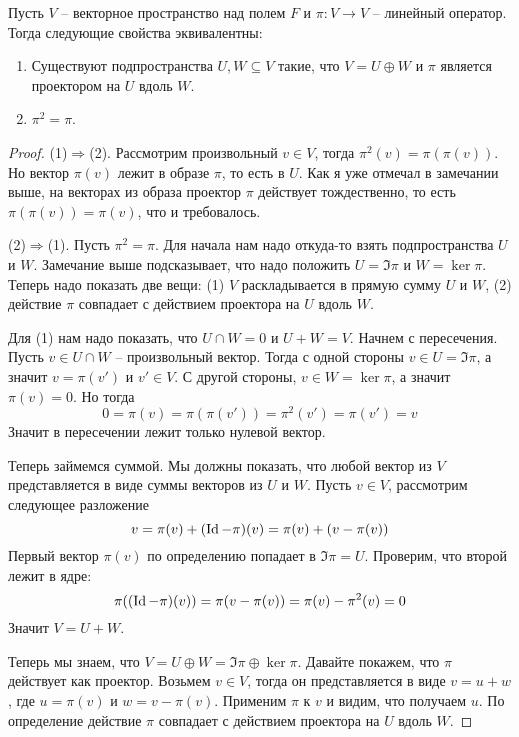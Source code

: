 \begin{claim}
Пусть $V$ -- векторное пространство над полем $F$ и $\pi\colon V\to V$ -- линейный оператор.
Тогда следующие свойства эквивалентны:
\begin{enumerate}
\item Существуют подпространства $U,W\subseteq V$ такие, что $V = U\oplus W$ и $\pi$ является проектором на $U$ вдоль $W$.
\item $\pi^2 = \pi$.
\end{enumerate}
\end{claim}
\begin{proof}
(1)$\Rightarrow$(2).
Рассмотрим произвольный $v\in V$, тогда $\pi^2(v) = \pi(\pi(v))$.
Но вектор $\pi(v)$ лежит в образе $\pi$, то есть в $U$.
Как я уже отмечал в замечании выше, на векторах из образа проектор $\pi$ действует тождественно, то есть $\pi(\pi(v)) = \pi(v)$, что и требовалось.

(2)$\Rightarrow$(1).
Пусть $\pi^2 = \pi$.
Для начала нам  надо откуда-то взять подпространства $U$ и $W$.
Замечание выше подсказывает, что надо положить $U = \Im \pi$ и $W = \ker \pi$.
Теперь надо показать две вещи: (1) $V$ раскладывается в прямую сумму $U$ и $W$, (2) действие $\pi$ совпадает с действием проектора на $U$ вдоль $W$.

Для (1) нам надо показать, что $U\cap W = 0$ и $U + W = V$.
Начнем с пересечения.
Пусть $v\in U\cap W$ -- произвольный вектор.
Тогда с одной стороны $v\in U = \Im \pi$, а значит $v = \pi(v')$ и $v'\in V$.
С другой стороны, $v\in W = \ker \pi$, а значит $\pi(v) = 0$.
Но тогда
\[
0 = \pi(v) = \pi(\pi(v')) = \pi^2(v') = \pi(v') = v
\]
Значит в пересечении лежит только нулевой вектор.

Теперь займемся суммой.
Мы должны показать, что любой вектор из $V$ представляется в виде суммы векторов из $U$ и $W$.
Пусть $v\in V$, рассмотрим следующее разложение
\[
v = \pi (v) + (\operatorname{Id} - \pi) (v) = \pi(v) + (v - \pi(v))
\]
Первый вектор $\pi(v)$ по определению попадает в $\Im\pi = U$.
Проверим, что второй лежит в ядре:
\[
\pi((\operatorname{Id} - \pi)(v)) = \pi(v - \pi(v)) = \pi(v) - \pi^2(v) = 0
\]
Значит $V = U + W$.

Теперь мы знаем, что $V = U\oplus W = \Im \pi \oplus \ker \pi$.
Давайте покажем, что $\pi$ действует как проектор.
Возьмем $v\in V$, тогда он представляется в виде $v = u + w$, где $u = \pi(v)$ и $w = v - \pi(v)$.
Применим $\pi$ к $v$ и видим, что получаем $u$.
По определение действие $\pi$ совпадает с действием проектора на $U$ вдоль $W$.
\end{proof}

